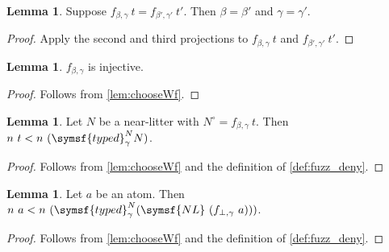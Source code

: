 \documentclass{article}
\theoremstyle{definition}
\newtheorem{lemma}[theorem]{Lemma}
\theoremstyle{remark}
\begin{document}
\begin{lemma}
    \label{lem:fuzz_congr}
    Suppose \( f_{\beta,\gamma}\ t = f_{\beta',\gamma'}\ t' \).
    Then \( \beta = \beta' \) and \( \gamma = \gamma' \).
\end{lemma}
\begin{proof}
    Apply the second and third projections to \( f_{\beta,\gamma}\ t \) and \( f_{\beta',\gamma'}\ t' \).
\end{proof}
\begin{lemma}
    \( f_{\beta,\gamma} \) is injective.
\end{lemma}
\begin{proof}
    Follows from \cref{lem:chooseWf}.
\end{proof}
\begin{lemma}
    Let \( N \) be a near-litter with \( N^\circ = f_{\beta,\gamma}\ t \).
    Then \( n\ t < n\ (\symsf{typed}^N_\gamma N) \).
\end{lemma}
\begin{proof}
    Follows from \cref{lem:chooseWf} and the definition of \cref{def:fuzz_deny}.
\end{proof}
\begin{lemma}
    Let \( a \) be an atom.
    Then \( n\ a < n\ (\symsf{typed}^N_\gamma (\symsf{NL}\ (f_{\bot,\gamma}\ a))) \).
\end{lemma}
\begin{proof}
    Follows from \cref{lem:chooseWf} and the definition of \cref{def:fuzz_deny}.
\end{proof}
\end{document}
